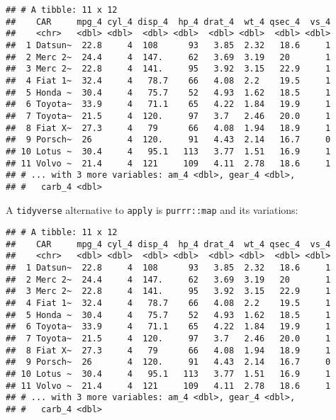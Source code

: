 \documentclass[
]{book}
\newenvironment{Shaded}{\begin{snugshade}}{\end{snugshade}}
\newcommand{\AttributeTok}[1]{\textcolor[rgb]{0.77,0.63,0.00}{#1}}
\newcommand{\ControlFlowTok}[1]{\textcolor[rgb]{0.13,0.29,0.53}{\textbf{#1}}}
\newcommand{\DecValTok}[1]{\textcolor[rgb]{0.00,0.00,0.81}{#1}}
\newcommand{\FunctionTok}[1]{\textcolor[rgb]{0.00,0.00,0.00}{#1}}
\newcommand{\NormalTok}[1]{#1}
\newcommand{\OtherTok}[1]{\textcolor[rgb]{0.56,0.35,0.01}{#1}}
\newcommand{\SpecialCharTok}[1]{\textcolor[rgb]{0.00,0.00,0.00}{#1}}
\newcommand{\StringTok}[1]{\textcolor[rgb]{0.31,0.60,0.02}{#1}}
\begin{document}
\begin{verbatim}
## # A tibble: 11 x 12
##    CAR     mpg_4 cyl_4 disp_4  hp_4 drat_4  wt_4 qsec_4  vs_4
##    <chr>   <dbl> <dbl>  <dbl> <dbl>  <dbl> <dbl>  <dbl> <dbl>
##  1 Datsun~  22.8     4  108      93   3.85  2.32   18.6     1
##  2 Merc 2~  24.4     4  147.     62   3.69  3.19   20       1
##  3 Merc 2~  22.8     4  141.     95   3.92  3.15   22.9     1
##  4 Fiat 1~  32.4     4   78.7    66   4.08  2.2    19.5     1
##  5 Honda ~  30.4     4   75.7    52   4.93  1.62   18.5     1
##  6 Toyota~  33.9     4   71.1    65   4.22  1.84   19.9     1
##  7 Toyota~  21.5     4  120.     97   3.7   2.46   20.0     1
##  8 Fiat X~  27.3     4   79      66   4.08  1.94   18.9     1
##  9 Porsch~  26       4  120.     91   4.43  2.14   16.7     0
## 10 Lotus ~  30.4     4   95.1   113   3.77  1.51   16.9     1
## 11 Volvo ~  21.4     4  121     109   4.11  2.78   18.6     1
## # ... with 3 more variables: am_4 <dbl>, gear_4 <dbl>,
## #   carb_4 <dbl>
\end{verbatim}

A \texttt{tidyverse} alternative to \texttt{apply} is \texttt{purrr::map} and its variations:

\begin{Shaded}
\end{Shaded}

\begin{verbatim}
## # A tibble: 11 x 12
##    CAR     mpg_4 cyl_4 disp_4  hp_4 drat_4  wt_4 qsec_4  vs_4
##    <chr>   <dbl> <dbl>  <dbl> <dbl>  <dbl> <dbl>  <dbl> <dbl>
##  1 Datsun~  22.8     4  108      93   3.85  2.32   18.6     1
##  2 Merc 2~  24.4     4  147.     62   3.69  3.19   20       1
##  3 Merc 2~  22.8     4  141.     95   3.92  3.15   22.9     1
##  4 Fiat 1~  32.4     4   78.7    66   4.08  2.2    19.5     1
##  5 Honda ~  30.4     4   75.7    52   4.93  1.62   18.5     1
##  6 Toyota~  33.9     4   71.1    65   4.22  1.84   19.9     1
##  7 Toyota~  21.5     4  120.     97   3.7   2.46   20.0     1
##  8 Fiat X~  27.3     4   79      66   4.08  1.94   18.9     1
##  9 Porsch~  26       4  120.     91   4.43  2.14   16.7     0
## 10 Lotus ~  30.4     4   95.1   113   3.77  1.51   16.9     1
## 11 Volvo ~  21.4     4  121     109   4.11  2.78   18.6     1
## # ... with 3 more variables: am_4 <dbl>, gear_4 <dbl>,
## #   carb_4 <dbl>
\end{verbatim}
\end{document}
